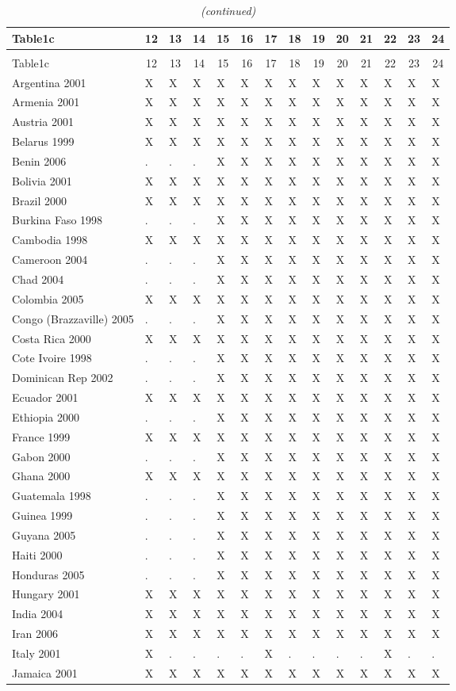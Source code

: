 \documentclass[a4paper]{article}
\begin{document}
\begin{longtable}{llllllllllllll} \caption{Availability In School}\tabularnewline
 \hline\hline
\multicolumn{1}{l}{Table1c}&\multicolumn{1}{c}{12}&\multicolumn{1}{c}{13}&\multicolumn{1}{c}{14}&\multicolumn{1}{c}{15}&\multicolumn{1}{c}{16}&\multicolumn{1}{c}{17}&\multicolumn{1}{c}{18}&\multicolumn{1}{c}{19}&\multicolumn{1}{c}{20}&\multicolumn{1}{c}{21}&\multicolumn{1}{c}{22}&\multicolumn{1}{c}{23}&\multicolumn{1}{c}{24}\tabularnewline
\hline
\endfirsthead
\caption[]{\em (continued)} \tabularnewline
\hline
\multicolumn{1}{l}{Table1c}&\multicolumn{1}{c}{12}&\multicolumn{1}{c}{13}&\multicolumn{1}{c}{14}&\multicolumn{1}{c}{15}&\multicolumn{1}{c}{16}&\multicolumn{1}{c}{17}&\multicolumn{1}{c}{18}&\multicolumn{1}{c}{19}&\multicolumn{1}{c}{20}&\multicolumn{1}{c}{21}&\multicolumn{1}{c}{22}&\multicolumn{1}{c}{23}&\multicolumn{1}{c}{24}\tabularnewline
\hline
\endhead
\hline
\endfoot
\label{Table1c}
Argentina 2001&X&X&X&X&X&X&X&X&X&X&X&X&X\tabularnewline
Armenia 2001&X&X&X&X&X&X&X&X&X&X&X&X&X\tabularnewline
Austria 2001&X&X&X&X&X&X&X&X&X&X&X&X&X\tabularnewline
Belarus 1999&X&X&X&X&X&X&X&X&X&X&X&X&X\tabularnewline
Benin 2006&.&.&.&X&X&X&X&X&X&X&X&X&X\tabularnewline
Bolivia 2001&X&X&X&X&X&X&X&X&X&X&X&X&X\tabularnewline
Brazil 2000&X&X&X&X&X&X&X&X&X&X&X&X&X\tabularnewline
Burkina Faso 1998&.&.&.&X&X&X&X&X&X&X&X&X&X\tabularnewline
Cambodia 1998&X&X&X&X&X&X&X&X&X&X&X&X&X\tabularnewline
Cameroon 2004&.&.&.&X&X&X&X&X&X&X&X&X&X\tabularnewline
Chad 2004&.&.&.&X&X&X&X&X&X&X&X&X&X\tabularnewline
Colombia 2005&X&X&X&X&X&X&X&X&X&X&X&X&X\tabularnewline
Congo (Brazzaville) 2005&.&.&.&X&X&X&X&X&X&X&X&X&X\tabularnewline
Costa Rica 2000&X&X&X&X&X&X&X&X&X&X&X&X&X\tabularnewline
Cote Ivoire 1998&.&.&.&X&X&X&X&X&X&X&X&X&X\tabularnewline
Dominican Rep 2002&.&.&.&X&X&X&X&X&X&X&X&X&X\tabularnewline
Ecuador 2001&X&X&X&X&X&X&X&X&X&X&X&X&X\tabularnewline
Ethiopia 2000&.&.&.&X&X&X&X&X&X&X&X&X&X\tabularnewline
France 1999&X&X&X&X&X&X&X&X&X&X&X&X&X\tabularnewline
Gabon 2000&.&.&.&X&X&X&X&X&X&X&X&X&X\tabularnewline
Ghana 2000&X&X&X&X&X&X&X&X&X&X&X&X&X\tabularnewline
Guatemala 1998&.&.&.&X&X&X&X&X&X&X&X&X&X\tabularnewline
Guinea 1999&.&.&.&X&X&X&X&X&X&X&X&X&X\tabularnewline
Guyana 2005&.&.&.&X&X&X&X&X&X&X&X&X&X\tabularnewline
Haiti 2000&.&.&.&X&X&X&X&X&X&X&X&X&X\tabularnewline
Honduras 2005&.&.&.&X&X&X&X&X&X&X&X&X&X\tabularnewline
Hungary 2001&X&X&X&X&X&X&X&X&X&X&X&X&X\tabularnewline
India 2004&X&X&X&X&X&X&X&X&X&X&X&X&X\tabularnewline
Iran 2006&X&X&X&X&X&X&X&X&X&X&X&X&X\tabularnewline
Italy 2001&X&.&.&.&.&X&.&.&.&.&X&.&.\tabularnewline
Jamaica 2001&X&X&X&X&X&X&X&X&X&X&X&X&X\tabularnewline

\end{longtable}
\end{document}
